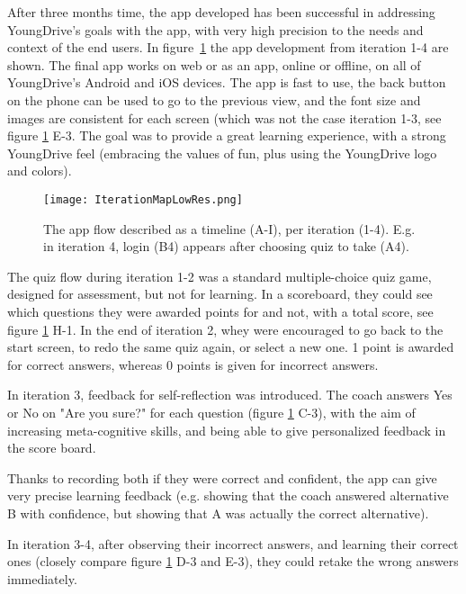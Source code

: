 After three months time, the app developed has been successful in addressing YoungDrive's goals with the app, with very high precision to the needs and context of the end users. In figure~\ref{fig:iteration-map} the app development from iteration 1-4 are shown. The final app works on web or as an app, online or offline, on all of YoungDrive's Android and iOS devices. The app is fast to use, the back button on the phone can be used to go to the previous view, and the font size and images are consistent for each screen (which was not the case iteration 1-3, see figure \ref{fig:iteration-map} E-3. The goal was to provide a great learning experience, with a strong YoungDrive feel (embracing the values of fun, plus using the YoungDrive logo and colors).

  \begin{figure}[h]
    \centering
    \texttt{[image: IterationMapLowRes.png]}
    \caption{The app flow described as a timeline (A-I), per iteration (1-4). E.g. in iteration 4, login (B4) appears after choosing quiz to take (A4).}
    \label{fig:iteration-map}
  \end{figure}


  The quiz flow during iteration 1-2 was a standard multiple-choice quiz game, designed for assessment, but not for learning. In a scoreboard, they could see which questions they were awarded points for and not, with a total score, see figure \ref{fig:iteration-map} H-1. In the end of iteration 2, whey were encouraged to go back to the start screen, to redo the same quiz again, or select a new one. 1 point is awarded for correct answers, whereas 0 points is given for incorrect answers.

  In iteration 3, feedback for self-reflection was introduced. The coach answers Yes or No on "Are you sure?" for each question (figure \ref{fig:iteration-map} C-3), with the aim of increasing meta-cognitive skills, and being able to give personalized feedback in the score board.

  Thanks to recording both if they were correct and confident, the app can give very precise learning feedback (e.g. showing that the coach answered alternative B with confidence, but showing that A was actually the correct alternative).

  In iteration 3-4, after observing their incorrect answers, and learning their correct ones (closely compare figure \ref{fig:iteration-map} D-3 and E-3), they could retake the wrong answers immediately.

